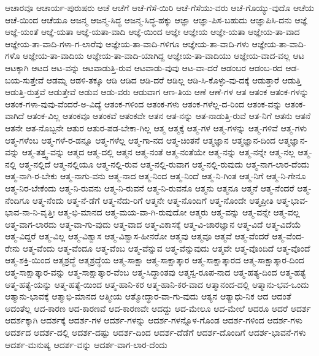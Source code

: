 {ಆಚಾರವೂ
ಆಚಾರ್ಯ-ಪುರುಷರು
ಆಚೆ
ಆಚೆಗೆ
ಆಚೆ-ಗೆಸೆ-ಯಿರಿ
ಆಚೆ-ಗೆಸೆಯು-ವರು
ಆಚೆ-ಗೊಯ್ಯು-ವುದೊ
ಆಚೆಯ
ಆಚೆ-ಯಿಂದ
ಆಚೆಯೂ
ಆಜನ್ಮ
ಆಜನ್ಮ-ಸಿದ್ಧ
ಆಜನ್ಮ-ಸಿದ್ಧ-ಹಕ್ಕು
ಆಜ್ಞಾ
ಆಜ್ಞಾ-ಪಿಸ-ಬಹುದು
ಆಜ್ಞಾಪಿಸಿ-ದನು
ಆಜ್ಞೆ
ಆಜ್ಞೆ-ಯಂತೆ
ಆಜ್ಞೆ-ಯತಾ
ಆಜ್ಞೆ-ಯತಾ-ವಾದಿ
ಆಜ್ಞೆ-ಯಿಂದ
ಆಜ್ಞೇ
ಆಜ್ಞೇಯ
ಆಜ್ಞೇ-ಯತಾ
ಆಜ್ಞೇಯ-ತಾ-ವಾದ
ಆಜ್ಞೇಯ-ತಾ-ವಾದಿ-ಗಳಾ-ಗ-ಲಾರೆವು
ಆಜ್ಞೇಯ-ತಾ-ವಾದಿ-ಗಳಿಗೂ
ಆಜ್ಞೇಯ-ತಾ-ವಾದಿ-ಗಳು
ಆಜ್ಞೇಯ-ತಾ-ವಾದಿ-ಗಳೊ
ಆಜ್ಞೇಯ-ತಾ-ವಾದಿಯ
ಆಜ್ಞೇಯ-ತಾ-ವಾದಿ-ಯಾಗಿದ್ದ
ಆಜ್ಞೇಯ-ತಾ-ವಾದಿಯು
ಆಜ್ಞೇಯ-ವಾದ-ವಲ್ಲ
ಆಟ
ಆಟಕ್ಕಾಗಿ
ಆಟದ
ಆಟ-ವನ್ನು
ಆಟವಾಡುತ್ತಿ-ರುವ
ಆಟವಾಡು-ವುವು
ಆಟ-ವಾ-ದರೆ
ಆಡಂಬರ
ಆಡಂಬ-ರದ
ಆಡ-ಬಯ-ಸುತ್ತೇವೆ
ಆಡಮ್ನ
ಆಡಳಿ-ತಕ್ಕೂ
ಆಡಿ
ಆಡಿದ
ಆಡಿ-ದರೆ
ಆಡಿಲ್ಲ
ಆಡಿ-ಸಿ-ಕೊಳ್ಳು-ವು-ದಕ್ಕೆ
ಆಡುತ್ತಾರೆ
ಆಡುತ್ತಿ
ಆಡುತ್ತಿ-ರುತ್ತವೆ
ಆಡುತ್ತೇವೆ
ಆಡುವ
ಆಡು-ವರು
ಆಡುವಾಗ
ಆಣ-ತಿಯ
ಆಣೆ
ಆಣೆ-ಗಳ
ಆತ
ಆತಂಕ
ಆತಂಕ-ಗಳನ್ನು
ಆತಂಕ-ಗಳಾ-ವುವು-ವೆಂದರೆ-ಅ-ವಿದ್ಯೆ
ಆತಂಕ-ಗಳಿಂದ
ಆತಂಕ-ಗಳು
ಆತಂಕ-ಗಳೆಲ್ಲ-ದ-ರಿಂದ
ಆತಂಕ-ವನ್ನು
ಆತಂಕ-ವಾಗಿದೆ
ಆತಂಕ-ವಿಲ್ಲ
ಆತಂಕವೂ
ಆತಂಕವೆ
ಆತಂಕವೇ
ಆತನ
ಆತ-ನನ್ನು
ಆತ-ನಾಡುತ್ತಿ-ರುವೆ
ಆತ-ನಿಗೆ
ಆತನು
ಆತನೆ
ಆತನೇ
ಆತ-ನೊಬ್ಬನೇ
ಆತುರ
ಆತುರ-ಪಡ-ಬೇಕಾ-ಗಿಲ್ಲ
ಆತ್ಮ
ಆತ್ಮಕ್ಕೆ
ಆತ್ಮ-ಗಳ
ಆತ್ಮ-ಗಳನ್ನು
ಆತ್ಮ-ಗಳಿವೆ
ಆತ್ಮ-ಗಳು
ಆತ್ಮ-ಗಳೆಂಬ
ಆತ್ಮ-ಗಳೆ-ರ-ಡನ್ನೂ
ಆತ್ಮ-ಗಳೆಲ್ಲ
ಆತ್ಮ-ಗಾ-ನದ
ಆತ್ಮ-ಚಿಂತನೆ
ಆತ್ಮಜ್ಞಾನ
ಆತ್ಮಜ್ಞಾನ-ದಿಂದ
ಆತ್ಮಜ್ಞಾನ-ವನ್ನು
ಆತ್ಮ-ತತ್ತ್ವ-ವನ್ನು
ಆತ್ಮದ
ಆತ್ಮ-ದಲ್ಲಿ
ಆತ್ಮನ
ಆತ್ಮ-ನಂತೆ
ಆತ್ಮ-ನಂತೆಯೇ
ಆತ್ಮ-ನನ್ನು
ಆತ್ಮ-ನನ್ನೇ
ಆತ್ಮ-ನಲ್ಲ
ಆತ್ಮ-ನಲ್ಲಿ
ಆತ್ಮ-ನಲ್ಲಿದೆ
ಆತ್ಮ-ನಲ್ಲಿಯೂ
ಆತ್ಮ-ನಲ್ಲಿ-ರುವ
ಆತ್ಮ-ನಲ್ಲಿ-ರುವಾಗ
ಆತ್ಮ-ನಲ್ಲಿ-ರುವುದು
ಆತ್ಮ-ನಾಗ-ಲಾರ-ದೆಂದು
ಆತ್ಮ-ನಾಗಿ-ರ-ಬೇಕು
ಆತ್ಮ-ನಾಗು-ವನು
ಆತ್ಮ-ನಾದ
ಆತ್ಮ-ನಿಂದ
ಆತ್ಮ-ನಿಂದೆ
ಆತ್ಮ-ನಿ-ಗಿಂತ
ಆತ್ಮ-ನಿಗೆ
ಆತ್ಮ-ನಿ-ಗೇನೂ
ಆತ್ಮ-ನಿರ-ಬೇಕೆಂದು
ಆತ್ಮ-ನಿ-ರುವನು
ಆತ್ಮ-ನಿ-ರುವನೆ
ಆತ್ಮ-ನಿ-ರುವನೊ
ಆತ್ಮನು
ಆತ್ಮನೂ
ಆತ್ಮನೆ
ಆತ್ಮ-ನೆಂದರೆ
ಆತ್ಮ-ನೆಂದಿಗೂ
ಆತ್ಮ-ನೆಂದು
ಆತ್ಮ-ನೆ-ಡೆಗೆ
ಆತ್ಮ-ನೆದು-ರಿಗೆ
ಆತ್ಮನೇ
ಆತ್ಮ-ನೊಂದಿಗೆ
ಆತ್ಮ-ನೊಂದೇ
ಆತ್ಮಪ್ರೀತಿ
ಆತ್ಮ-ಭಾವ-ಭಾವ-ನಾ-ನಿ-ವೃತ್ತಿಃ
ಆತ್ಮ-ಭಿ-ಮಾನದ
ಆತ್ಮ-ಮಯ-ವಾ-ಗಿ-ರುವುದೋ
ಆತ್ಮರು
ಆತ್ಮ-ವನ್ನು
ಆತ್ಮ-ವನ್ನೇ
ಆತ್ಮ-ವಲ್ಲ
ಆತ್ಮ-ವಾಗ-ಲಾರದು
ಆತ್ಮ-ವಾ-ಗು-ವುದು
ಆತ್ಮ-ವಾದ
ಆತ್ಮ-ವಿಕಾಸಕ್ಕೆ
ಆತ್ಮ-ವಿ-ಚಾರಜ್ಞಾನ
ಆತ್ಮ-ವಿದೆ
ಆತ್ಮ-ವಿದೆಯೆ
ಆತ್ಮ-ವಿದ್ದರೆ
ಆತ್ಮ-ವಿಲ್ಲ
ಆತ್ಮ-ವಿಶ್ವಾಸ
ಆತ್ಮ-ವಿಶ್ವಾಸ-ಹೀನರೋ
ಆತ್ಮವು
ಆತ್ಮವೂ
ಆತ್ಮವೆ
ಆತ್ಮ-ವೆಂದರೆ
ಆತ್ಮ-ವೆಂದ-ರೇನು
ಆತ್ಮ-ವೆಂದು
ಆತ್ಮ-ವೆಂದೂ
ಆತ್ಮ-ವೆಂಬ
ಆತ್ಮ-ವೆನ್ನುವ
ಆತ್ಮ-ವೆನ್ನುವುದು
ಆತ್ಮವೇ
ಆತ್ಮ-ವೊಂದಿದೆ
ಆತ್ಮ-ವೊಂದೆ
ಆತ್ಮ-ಶಕ್ತಿ-ಯಿಂದ
ಆತ್ಮಶ್ರದ್ಧೆ
ಆತ್ಮಶ್ರದ್ಧೆಯ
ಆತ್ಮ-ಸಾಕ್ಷಾ
ಆತ್ಮ-ಸಾಕ್ಷಾತ್ಕಾರ
ಆತ್ಮ-ಸಾಕ್ಷಾತ್ಕಾರದ
ಆತ್ಮ-ಸಾಕ್ಷಾತ್ಕಾರ-ದಿಂದ
ಆತ್ಮ-ಸಾಕ್ಷಾತ್ಕಾರ-ವನ್ನು
ಆತ್ಮ-ಸಾಕ್ಷಾತ್ಕಾರ-ವೆಂಬ
ಆತ್ಮ-ಸಿದ್ಧಾಂತವು
ಆತ್ಮಸ್ವ-ರೂಪ-ನಾದ
ಆತ್ಮ-ಹತ್ಯ-ದಿಂದ
ಆತ್ಮ-ಹತ್ಯೆ
ಆತ್ಮ-ಹತ್ಯೆ-ಯನ್ನು
ಆತ್ಮ-ಹತ್ಯೆ-ಯಿಂದ
ಆತ್ಮ-ಹಾನಿ-ಕರ
ಆತ್ಮ-ಹಾನಿ-ಕರ-ವಾದ
ಆತ್ಮಾನಂದ-ದಲ್ಲಿ
ಆತ್ಮಾನು-ಭವ-ಒಂದು
ಆತ್ಮಾನು-ಭಾವಕ್ಕೆ
ಆತ್ಮಾಭಿ-ಮಾನದ
ಆತ್ಮೀಯ
ಆತ್ಮೋದ್ಧಾರ-ವಾ-ಗು-ವುದು
ಆತ್ಯನ
ಆತ್ಯಾಧು-ನಿಕ
ಆದ
ಆದಂತೆ
ಆದಂತೆಲ್ಲ
ಆದ-ಕಾರಣ
ಆದ-ಕಾರಣವೆ
ಆದ-ಕಾರಣವೇ
ಆದದ್ದು
ಆದ-ಮೇಲೂ
ಆದ-ಮೇಲೆ
ಆದರೂ
ಆದರೆ
ಆದರ್ಶ
ಆದರ್ಶಕ್ಕಾಗಿ
ಆದರ್ಶಕ್ಕೆ
ಆದರ್ಶ-ಗಳ
ಆದರ್ಶ-ಗಳನ್ನು
ಆದರ್ಶ-ಗಳನ್ನೊಳ-ಗೊಂಡ
ಆದರ್ಶ-ಗಳಿಂದ
ಆದರ್ಶ-ಗಳು
ಆದರ್ಶದ
ಆದರ್ಶ-ದಲ್ಲಿ
ಆದರ್ಶ-ದಷ್ಟು
ಆದರ್ಶ-ದಿಂದ
ಆದರ್ಶ-ದೆಡೆಗೆ
ಆದರ್ಶ-ದೊಂದಿಗೆ
ಆದರ್ಶ-ಭಾವನೆ-ಗಳು
ಆದರ್ಶ-ಮನುಷ್ಯ
ಆದರ್ಶ-ವನ್ನು
ಆದರ್ಶ-ವಾಗ-ಲಾರ-ದೆಂದು
}
